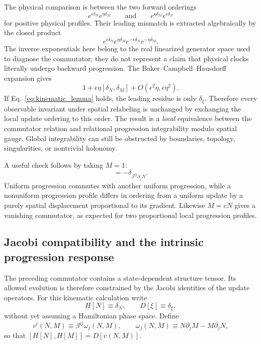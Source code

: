 \documentclass[11pt]{article}
\begin{document}
The physical comparison is between the two forward orderings
\begin{equation}
    e^{\epsilon\delta_N}e^{\eta\delta_M}
    \qquad\text{and}\qquad
    e^{\eta\delta_M}e^{\epsilon\delta_N}
\end{equation}
for positive physical profiles. Their leading mismatch is extracted algebraically by the closed product
\begin{equation}
    e^{\epsilon\delta_N}e^{\eta\delta_M}
    e^{-\epsilon\delta_N}e^{-\eta\delta_M}.
\end{equation}
The inverse exponentials here belong to the real linearized generator space used to diagnose the commutator; they do not represent a claim that physical clocks literally undergo backward progression. The Baker--Campbell--Hausdorff expansion gives
\begin{equation}
    1+\epsilon\eta[\delta_N,\delta_M]
    +O(\epsilon^2\eta,\epsilon\eta^2).
\end{equation}
If Eq.~\eqref{eq:kinematic_lemma} holds, the leading residue is only $\delta_\xi$. Therefore every observable invariant under spatial relabeling is unchanged by exchanging the local update ordering to this order. The result is a \emph{local} equivalence between the commutator relation and relational progression integrability modulo spatial gauge. Global integrability can still be obstructed by boundaries, topology, singularities, or nontrivial holonomy.

A useful check follows by taking $M=1$:
\begin{equation}
    [\delta_N,\delta_1]
    =-\delta_{\beta^{ij}\partial_jN}.
    \label{eq:uniform_check}
\end{equation}
Uniform progression commutes with another uniform progression, while a nonuniform progression profile differs in ordering from a uniform update by a purely spatial displacement proportional to its gradient. Likewise $M=cN$ gives a vanishing commutator, as expected for two proportional local progression profiles.

\subsection{Jacobi compatibility and the intrinsic progression response}
\label{sec:jacobi_compatibility}

The preceding commutator contains a state-dependent structure tensor. Its allowed evolution is therefore constrained by the Jacobi identities of the update operators. For this kinematic calculation write
\begin{equation}
    H[N]\equiv\delta_N,
    \qquad
    D[\xi]\equiv\delta_\xi,
\end{equation}
without yet assuming a Hamiltonian phase space. Define
\begin{equation}
    v^i(N,M)
    \equiv
    \beta^{ij}\omega_j(N,M),
    \qquad
    \omega_j(N,M)
    \equiv
    N\partial_jM-M\partial_jN,
    \label{eq:v_beta_omega}
\end{equation}
so that $[H[N],H[M]]=D[v(N,M)]$.
\end{document}

